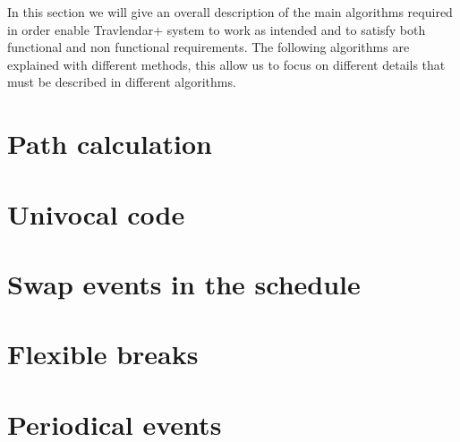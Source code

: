 In this section we will give an overall description of the main algorithms required in order enable Travlendar+ system to work as intended and to satisfy both functional and non functional requirements.
The following algorithms are explained with different methods, this allow us to focus on different details that must be described in different algorithms.

\section{Path calculation}
\label{sect:Path calculation}
	

\section{Univocal code}
\label{sect: Univocal code}
	

\section{Swap events in the schedule}
\label{sect: Swap events in the schedule}
	

\section{Flexible breaks}
\label{sect: Flexible breaks}
	

\section{Periodical events}
\label{sect: Periodical events}
	

